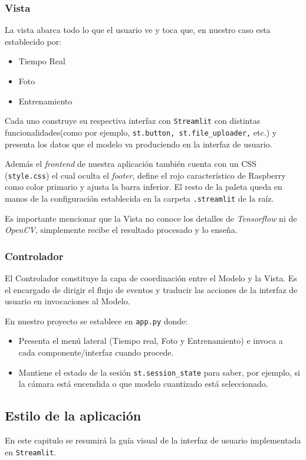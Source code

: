 \subsubsection{Vista}
La vista abarca todo lo que el usuario ve y toca que, en nuestro caso esta establecido por:

\begin{itemize}
    \item Tiempo Real
    \item Foto
    \item Entrenamiento
\end{itemize}

Cada uno construye su respectiva interfaz con \texttt{Streamlit} con distintas funcionalidades(como por ejemplo, \texttt{st.button, st.file\_uploader,} etc.) y presenta los datos que el modelo va produciendo en la interfaz de usuario.

Además el \textit{frontend} de nuestra aplicación también cuenta con un CSS (\texttt{style.css}) el cual oculta el \textit{footer}, define el rojo característico de Raspberry como color primario y ajusta la barra inferior. El resto de la paleta queda en manos de la configuración establecida en la carpeta \texttt{.streamlit} de la raíz.

Es importante mencionar que la Vista no conoce los detalles de \textit{Tensorflow} ni de \textit{OpenCV}, simplemente recibe el resultado procesado y lo enseña.

\subsubsection{Controlador}
El Controlador constituye la capa de coordinación entre el Modelo y la Vista. Es el encargado de dirigir el flujo de eventos y traducir las acciones de la interfaz de usuario en invocaciones al Modelo.

En nuestro proyecto se establece en \texttt{app.py} donde:
\begin{itemize}
    \item Presenta el menú lateral (Tiempo real, Foto y Entrenamiento) e invoca a cada componente/interfaz cuando procede.
    \item Mantiene el estado de la sesión \texttt{st.session\_state} para saber, por ejemplo, si la cámara está encendida o que modelo cuantizado está seleccionado. 
\end{itemize}

\subsection{Estilo de la aplicación}
En este capitulo se resumirá la guía visual de la interfaz de usuario implementada en \texttt{Streamlit}.

